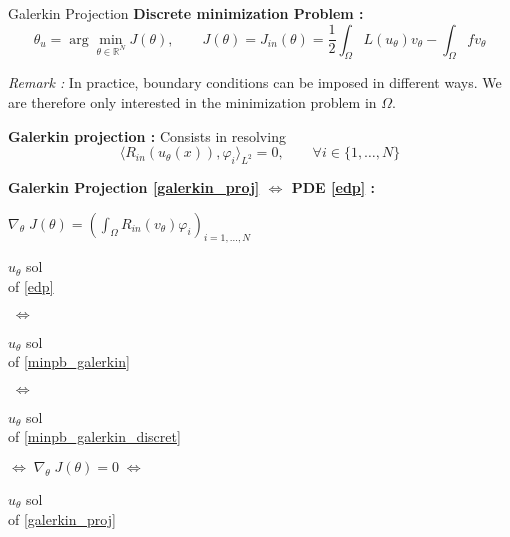 \begin{frame}{Galerkin Projection}
	\textbf{Discrete minimization Problem :}
	\begin{equation}
		\theta_u=\arg\min_{\theta\in\mathbb{R}^N} J(\theta), \qquad J(\theta)=J_{in}(\theta)=\frac{1}{2}\int_\Omega L(u_\theta)v_\theta - \int_\Omega fv_\theta \label{minpb_galerkin_discret}
	\end{equation}
%		
	
	\footnotesize	
	\textit{Remark :} In practice, boundary conditions can be imposed in different ways. We are therefore only interested in the minimization problem in $\Omega$.
	
	\normalsize	
	
	\textbf{Galerkin projection :} Consists in resolving
	\begin{equation}
		\langle R_{in}(u_\theta(x)),\varphi_i\rangle_{L^2}=0, \qquad \forall i\in\{1,\dots,N\}\label{galerkin_proj}
	\end{equation}

	\footnotesize
	\begin{center}
		\begin{tcolorbox}[
			colback=white, %
			colframe=other, %
			arc=2mm, %
			boxrule=0.5pt, %
			breakable, enhanced jigsaw,
			width=\linewidth
			]
			
			\textbf{Galerkin Projection \eqref{galerkin_proj} $\Leftrightarrow$ PDE \eqref{edp} :}
			
			\centering
			$\nabla_\theta \; J(\theta)=\left(\int_\Omega R_{in}(v_\theta)\varphi_i\right)_{i=1,\dots,N} \qquad $  
			
			\vspace{5pt}
			
			\begin{minipage}{0.1\linewidth}
				\centering
				$u_\theta$ sol \\
				of \eqref{edp}
			\end{minipage} $\; \Leftrightarrow \;$	\begin{minipage}{0.1\linewidth}
				\centering
				$u_\theta$ sol \\
				of \eqref{minpb_galerkin}
			\end{minipage} $\; \Leftrightarrow \;$	\begin{minipage}{0.1\linewidth}
				\centering
				$u_\theta$ sol \\
				of \eqref{minpb_galerkin_discret}
			\end{minipage} $\Leftrightarrow \; \nabla_\theta \; J(\theta)=0 \; \Leftrightarrow$ \begin{minipage}{0.1\linewidth}
				\centering
				$u_\theta$ sol \\
				of \eqref{galerkin_proj}
			\end{minipage}
		

\end{tcolorbox}
\end{center}
\end{frame}
